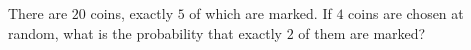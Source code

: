 There are \(20\) coins, exactly \(5\) of which are marked. If \(4\) coins are chosen at random, what is the probability that exactly \(2\) of them are marked?
